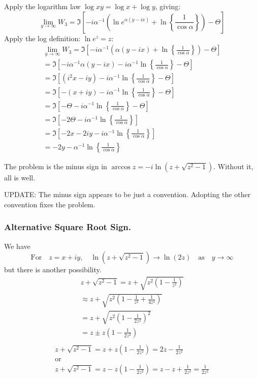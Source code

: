 \documentclass[a4paper]{report}
\begin{document}
Apply the logarithm law $\log xy = \log x + \log y$, giving:
\begin{equation}
\lim_{y \to \infty} W_3 =
 \Im \left[  
 - i \alpha^{-1} \left( \ln  e^{\alpha (y - ix)} +
\ln \left\{ \frac{ 1 }{\cos \alpha} \right\}
 \right) 
  - \Theta  \right] 
\end{equation}
Apply the log definition: $\ln e^z = z$:
\begin{align}
\lim_{y \to \infty} W_3
=   \Im \left[  
 - i \alpha^{-1} \left( \alpha (y - ix) +
\ln \left\{ \frac{ 1 }{\cos \alpha} \right\}
 \right) 
  - \Theta  \right] 
\\
=  \Im \left[  
 - i \alpha^{-1} \alpha (y - ix) 
 - i \alpha^{-1} \ln \left\{ \frac{ 1 }{\cos \alpha} \right\}
  - \Theta  \right] 
\\
= \Im \left[  
  (i^2 x - iy) 
 - i \alpha^{-1} \ln \left\{ \frac{ 1 }{\cos \alpha} \right\}
  - \Theta  \right]
\\
= \Im \left[  
  -(x + iy) 
 - i \alpha^{-1} \ln \left\{ \frac{ 1 }{\cos \alpha} \right\}
  - \Theta  \right]
\\
= \Im \left[  
  - \Theta
 - i \alpha^{-1} \ln \left\{ \frac{ 1 }{\cos \alpha} \right\}
  - \Theta  \right]
\\
= \Im \left[  
  - 2 \Theta
 - i \alpha^{-1} \ln \left\{ \frac{ 1 }{\cos \alpha} \right\}
      \right]
\\
= \Im \left[  
  - 2x - 2iy
 - i \alpha^{-1} \ln \left\{ \frac{ 1 }{\cos \alpha} \right\}
      \right]
\\
= - 2y
  - \alpha^{-1} \ln \left\{ \frac{ 1 }{\cos \alpha} \right\}
\end{align}

The problem is the minus sign in $\arccos z = - i \ln (z + \sqrt{z^{2} - 1})$.  Without it, all is well.

UPDATE:  The minus sign appears to be just a convention.  Adopting the other convention fixes the problem.

\subsubsection*{Alternative Square Root Sign.}

We have 
\begin{equation}
\text{For} \quad z = x + iy, \quad \ln(z + \sqrt{z^2 - 1}) \to \ln(2z)
\quad \text{as} \quad y \to \infty
\end{equation}
but there is another possibility.
\begin{align}
z + \sqrt{z^2 - 1} = z + \sqrt{z^2(1 - \frac{1}{z^2})} \\ \approx
 z + \sqrt{z^2(1 - \frac{1}{z^2} + \frac{1}{4z^4})} \\
 = z + \sqrt{z^2(1 - \frac{1}{2z^2})^2} \\
 = z \pm z (1 - \frac{1}{2z^2}) \\
\end{align}
\begin{gather}
z + \sqrt{z^2 - 1} = z + z(1 - \frac{1}{2z^2}) = 2z - \frac{1}{2z^2} \\
\text{or} \\
z + \sqrt{z^2 - 1} = z - z(1 - \frac{1}{2z^2}) = z - z + \frac{1}{2z^2} = \frac{1}{2z^2}
\end{gather}
\end{document}

